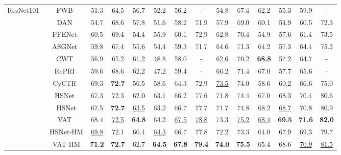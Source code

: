 \documentclass[runningheads]{llncs}
\begin{document}
\begin{table}[!htbp]
{\begin{tabular}{@{}cc|cccccc|cccccc@{}}
\multirow{12}{*}{ResNet101~\cite{Resnet}} & FWB~\cite{FWB} & 51.3 & 64.5 & 56.7 & 52.2 & 56.2 & - & 54.8 & 67.4 & 62.2 & 55.3 & 59.9 & - \\
 & DAN~\cite{DAN} & 54.7 & 68.6 & 57.8 & 51.6 & 58.2 & 71.9 & 57.9 & 69.0 & 60.1 & 54.9 & 60.5 & 72.3 \\
 & PFENet~\cite{PFENet} & 60.5 & 69.4 & 54.4 & 55.9 & 60.1 & 72.9 & 62.8 & 70.4 & 54.9 & 57.6 & 61.4 & 73.5 \\
 & ASGNet~\cite{ASGNet} & 59.8 & 67.4 & 55.6 & 54.4 & 59.3 & 71.7 & 64.6 & 71.3 & 64.2 & 57.3 & 64.4 & 75.2  \\
 & CWT~\cite{CWT} & 56.9 & 65.2 & 61.2 & 48.8 & 58.0 & - & 62.6 & 70.2 & \textbf{68.8} & 57.2 & 64.7 & - \\
 & RePRI~\cite{RePRI} & 59.6 & 68.6 & {62.2} & 47.2 & 59.4 & - & 66.2 & 71.4 & 67.0 & 57.7 & 65.6 & -  \\
 & CyCTR~\cite{zhang2021fewshot} & {69.3} & \textbf{72.7} & 56.5 & 58.6 & 64.3 & 72.9 & \underline{73.5} & 74.0 & 58.6 & 60.2 & 66.6 & 75.0 \\
 & HSNet~\cite{HSNet} & 67.3 & {72.3} & 62.0 & 63.1 & {66.2} & 77.6 & 71.8 & {74.4} & 67.0 & {68.3} & {70.4} & {80.6} \\
 & HSNet & 67.5 & \textbf{72.7} & \underline{63.5} & {63.2} & {66.7} & {77.7} & 71.7 & {74.8} & {68.2} & \underline{68.7} & {70.8} & {80.9} \\
& VAT~\cite{VAT} & {68.4} & \underline{72.5} & \textbf{64.8} & {64.2} & \underline{67.5}  & \underline{78.8} & {73.3} & \underline{75.2} & \underline{68.4} & \textbf{69.5} & \textbf{71.6} & \textbf{82.0} \\

 \cmidrule(l){2-14}  
 & HSNet-HM & \underline{69.8} & 72.1 & 60.4 & \underline{64.3} & {66.7}  & {77.8} & {72.2} & 73.3 & 64.0 & 67.9 & 69.3 & 79.7 \\ 
 & VAT-HM & \textbf{71.2} & \textbf{72.7} & {62.7} & \textbf{64.5} & \textbf{67.8}  & \textbf{79.4} & \textbf{74.0} & \textbf{75.5} & 65.4 & {68.6} & \underline{70.9} & \underline{81.5} \\

 
 \bottomrule

\end{tabular}
}
\end{table}
\end{document}
